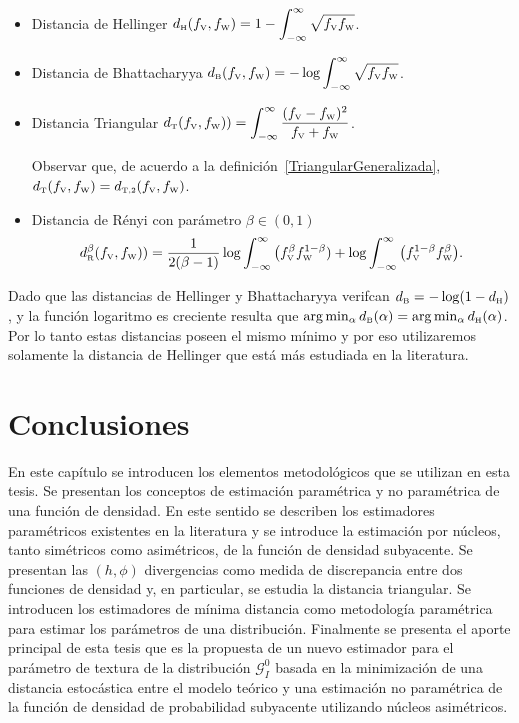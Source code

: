 \begin{itemize}
	\item Distancia de Hellinger $d_\text{\tiny H}(f_\text{\tiny V},f_\text{\tiny W})=1-\displaystyle{\int_{-\infty}^{\infty}\sqrt{f_\text{\tiny V} f_\text{\tiny W}}}$.
	
	\item Distancia de Bhattacharyya $d_\text{\tiny B}(f_\text{\tiny V},f_\text{\tiny W})=-\log\displaystyle{\int_{-\infty}^{\infty}\sqrt{f_\text{\tiny V} f_\text{\tiny W}}}$.
	
	\item Distancia Triangular $d_\text{\tiny T}(f_\text{\tiny V},f_\text{\tiny W}))=\displaystyle{\int_{-\infty}^{\infty}\frac{(f_\text{\tiny V}-f_\text{\tiny W})^2}{f_\text{\tiny V}+f_\text{\tiny W}}}$.
	
	Observar que, de acuerdo a la definición~\ref{TriangularGeneralizada}, $d_\text{\tiny T}(f_\text{\tiny V},f_\text{\tiny W})=d_{\text{\tiny{T,2}}}(f_\text{\tiny V},f_\text{\tiny W})$.
	
	\item Distancia de R\'enyi con parámetro $\beta\in(0,1)$
	$$
	d_\text{\tiny R}^{\beta}(f_\text{\tiny V},f_\text{\tiny W}))=\frac{1}{2(\beta-1)}\log\displaystyle{\int_{-\infty}^{\infty}\big({f_\text{\tiny V}^{\beta}f_\text{\tiny W}^{1-\beta})}+\log\displaystyle{\int_{-\infty}^{\infty}\big(f_\text{\tiny V}^{1-\beta}f_\text{\tiny W}^{\beta}}}\big).
	$$
\end{itemize}

Dado que las distancias de Hellinger y Bhattacharyya verifcan $d_\text{\tiny B}=-\log(1-d_\text{\tiny H})$, y la función logaritmo es creciente resulta que $\arg\min_\alpha d_\text{\tiny B}(\alpha )=\arg\min_ \alpha d_\text{\tiny H}(\alpha )$. Por lo tanto estas distancias poseen el mismo mínimo y por eso utilizaremos solamente la distancia de Hellinger que está más estudiada en la literatura.

\section{Conclusiones}

En este capítulo se introducen los elementos metodológicos que se utilizan en esta tesis. Se presentan los conceptos de estimación paramétrica y no paramétrica de una función de densidad. En este sentido se describen los estimadores  paramétricos existentes en la literatura y se introduce la estimación por núcleos, tanto simétricos como asimétricos, de la función de densidad subyacente.  Se  presentan las $(h,\phi)$ divergencias como medida de discrepancia entre dos funciones de densidad y, en particular, se estudia la distancia triangular. Se introducen los estimadores de mínima distancia como metodología paramétrica para estimar los parámetros de una distribución. Finalmente se presenta el aporte principal de esta tesis que es la propuesta de un nuevo estimador para el parámetro de textura de la distribución $\mathcal{G}_I^0$ basada en la minimización de una distancia estocástica entre el modelo teórico y una estimación no paramétrica de la función de densidad de probabilidad subyacente utilizando núcleos asimétricos.